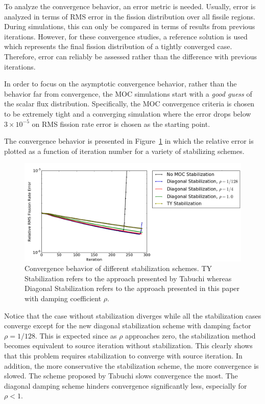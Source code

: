 To analyze the convergence behavior, an error metric is needed. Usually, error is analyzed in terms of \ac{RMS} error in the fission distribution over all fissile regions. During simulations, this can only be compared in terms of results from previous iterations. However, for these convergence studies, a reference solution is used which represents the final fission distribution of a tightly converged case. Therefore, error can reliably be assessed rather than the difference with previous iterations.

In order to focus on the asymptotic convergence behavior, rather than the behavior far from convergence, the \ac{MOC} simulations start with a \textit{good guess} of the scalar flux distribution. Specifically, the \ac{MOC} convergence criteria is chosen to be extremely tight and a converging simulation where the error drops below $3\times 10^{-5}$ on \ac{RMS} fission rate error is chosen as the starting point.

The convergence behavior is presented in Figure~\ref{fig:no-cmfd} in which the relative error is plotted as a function of iteration number for a variety of stabilizing schemes.
\begin{figure}[ht!]
	\centering
	\includegraphics[width=1.0\linewidth]{figures/convergence/no_cmfd.png}
	\caption{Convergence behavior of different stabilization schemes. TY Stabilization refers to the approach presented by Tabuchi whereas Diagonal Stabilization refers to the approach presented in this paper with damping coefficient $\rho$.}
	\label{fig:no-cmfd}
\end{figure}
Notice that the case without stabilization diverges while all the stabilization cases converge except for the new diagonal stabilization scheme with damping factor $\rho = 1/128$. This is expected since as $\rho$ approaches zero, the stabilization method becomes equivalent to source iteration without stabilization. This clearly shows that this problem requires stabilization to converge with source iteration. In addition, the more conservative the stabilization scheme, the more convergence is slowed. The scheme proposed by Tabuchi slows convergence the most. The diagonal damping scheme hinders convergence significantly less, especially for $\rho < 1$.

